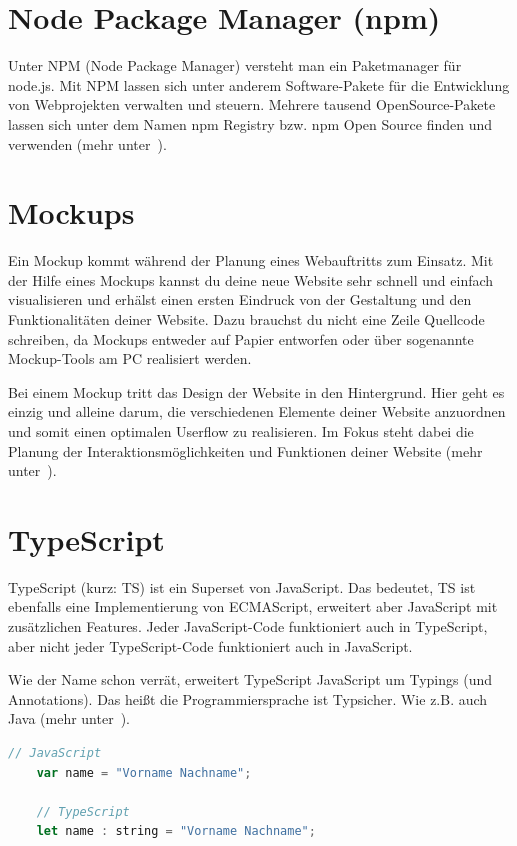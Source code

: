 \section{Node Package Manager (npm)}
Unter NPM (Node Package Manager) versteht man ein Paketmanager für node.js. Mit NPM lassen sich unter anderem
Software-Pakete für die Entwicklung von Webprojekten verwalten und steuern. Mehrere tausend OpenSource-Pakete lassen sich
unter dem Namen npm Registry bzw. npm Open Source finden und verwenden (mehr unter~\cite{book_grundlagen_npm}).

\section{Mockups}
Ein Mockup kommt während der Planung eines Webauftritts zum Einsatz. Mit der Hilfe eines Mockups kannst du deine neue
Website sehr schnell und einfach visualisieren und erhälst einen ersten Eindruck von der Gestaltung und den
Funktionalitäten deiner Website. Dazu brauchst du nicht eine Zeile Quellcode schreiben, da Mockups entweder auf Papier
entworfen oder über sogenannte Mockup-Tools am PC realisiert werden.

Bei einem Mockup tritt das Design der Website in den Hintergrund. Hier geht es einzig und alleine darum, die
verschiedenen Elemente deiner Website anzuordnen und somit einen optimalen Userflow zu realisieren. Im Fokus steht
dabei die Planung der Interaktionsmöglichkeiten und Funktionen deiner Website (mehr unter~\cite{book_grundlagen_mockups}).

\section{TypeScript}
TypeScript (kurz: TS) ist ein Superset von JavaScript. Das bedeutet, TS ist ebenfalls eine Implementierung von ECMAScript,
erweitert aber JavaScript mit zusätzlichen Features. Jeder JavaScript-Code funktioniert auch in TypeScript, aber nicht
jeder TypeScript-Code funktioniert auch in JavaScript.

Wie der Name schon verrät, erweitert TypeScript JavaScript um Typings (und Annotations). Das heißt die Programmiersprache
ist Typsicher. Wie z.B. auch Java (mehr unter~\cite{book_grundlagen_typescript}).

\begin{lstlisting}[language=JavaScript, caption=Unterschied zwischen JavaScript und TypeScript, label=Unterschied zwischen JavaScript und TypeScript]
    // JavaScript
    var name = "Vorname Nachname";

    // TypeScript
    let name : string = "Vorname Nachname";
\end{lstlisting}

